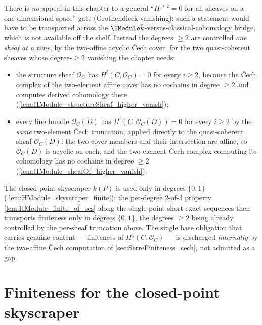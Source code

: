 There is \emph{no} appeal in this chapter to a general
``\(H^{\ge 2} = 0\) for all sheaves on a one-dimensional space'' gate
(Grothendieck vanishing): such a statement would have to be transported
across the \(\HModule \bar k\)-versus-classical-cohomology bridge, which
is not available off the shelf. Instead the degrees \(\ge 2\) are
controlled \emph{one sheaf at a time}, by the two-affine acyclic Čech
cover, for the two quasi-coherent sheaves whose degree-\(\ge 2\)
vanishing the chapter needs:
\begin{itemize}
  \item the structure sheaf \(\mathcal O_C\) has
    \(H^i(C, \mathcal O_C) = 0\) for every \(i \ge 2\), because the
    Čech complex of the two-element affine cover has no cochains in
    degree \(\ge 2\) and computes derived cohomology there
    (\cref{lem:HModule_structureSheaf_higher_vanish});
  \item every line bundle \(\mathcal O_C(D)\) has
    \(H^i(C, \mathcal O_C(D)) = 0\) for every \(i \ge 2\) by the
    \emph{same} two-element Čech truncation, applied directly to the
    quasi-coherent sheaf \(\mathcal O_C(D)\): the two cover members and
    their intersection are affine, so \(\mathcal O_C(D)\) is acyclic on
    each, and the two-element Čech complex computing its cohomology has
    no cochains in degree \(\ge 2\)
    (\cref{lem:HModule_sheafOf_higher_vanish}).
\end{itemize}
The closed-point skyscraper \(k(P)\) is used only in degrees
\(\{0, 1\}\) (\cref{lem:HModule_skyscraper_finite}); the per-degree
2-of-3 property \cref{lem:HModule_finite_of_ses} along the single-point
short exact sequences then transports finiteness only in degrees
\(\{0, 1\}\), the degrees \(\ge 2\) being already controlled by the
per-sheaf truncation above.
The single base obligation that carries genuine content --- finiteness
of \(H^1(C, \mathcal O_C)\) --- is discharged \emph{internally} by the
two-affine Čech computation of \cref{sec:SerreFiniteness_cech}, not
admitted as a gap.

\section{Finiteness for the closed-point skyscraper}
\label{sec:SerreFiniteness_skyscraper}

